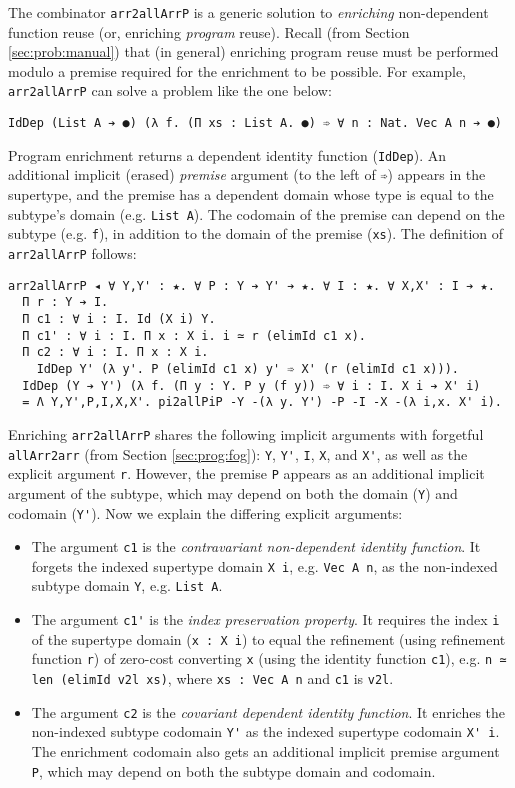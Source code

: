 \documentclass[acmsmall]{acmart}\settopmatter{}
\newcommand{\refsec}[1]{Section \ref{sec:#1}}
\begin{document}
The combinator \verb;arr2allArrP; is a generic solution to
\textit{enriching} non-dependent function reuse
(or, enriching \textit{program} reuse).
Recall (from \refsec{prob:manual}) that (in general)
enriching program reuse must be
performed modulo a premise required for the enrichment
to be possible.
For example, \verb;arr2allArrP; can solve a problem like the one
below:
\begin{verbatim}
IdDep (List A ➔ ●) (λ f. (Π xs : List A. ●) ➾ ∀ n : Nat. Vec A n ➔ ●)
\end{verbatim}
Program enrichment returns a dependent identity function
(\verb;IdDep;). 
An additional implicit (erased) \textit{premise} argument
(to the left of \verb;➾;)
appears in the supertype, and the premise has a dependent domain
whose type is equal to the subtype's domain (e.g. \verb;List A;).
The codomain of the premise can depend on the subtype (e.g. \verb;f;),
in addition to the domain of the premise (\verb;xs;).
The definition of \verb;arr2allArrP; follows:
\begin{verbatim}
arr2allArrP ◂ ∀ Y,Y' : ★. ∀ P : Y ➔ Y' ➔ ★. ∀ I : ★. ∀ X,X' : I ➔ ★.
  Π r : Y ➔ I.
  Π c1 : ∀ i : I. Id (X i) Y.
  Π c1' : ∀ i : I. Π x : X i. i ≃ r (elimId c1 x).
  Π c2 : ∀ i : I. Π x : X i. 
    IdDep Y' (λ y'. P (elimId c1 x) y' ➾ X' (r (elimId c1 x))).
  IdDep (Y ➔ Y') (λ f. (Π y : Y. P y (f y)) ➾ ∀ i : I. X i ➔ X' i)
  = Λ Y,Y',P,I,X,X'. pi2allPiP -Y -(λ y. Y') -P -I -X -(λ i,x. X' i).
\end{verbatim}
Enriching \verb;arr2allArrP; shares the following implicit arguments
with forgetful \verb;allArr2arr; (from \refsec{prog:fog}): \verb;Y;,
\verb;Y';, \verb;I;, \verb;X;, and \verb;X';, as well as the explicit
argument \verb;r;.  However, the premise \verb;P; appears as an
additional implicit argument of the subtype, which may depend on both
the domain (\verb;Y;) and codomain (\verb;Y';). Now we explain the
differing explicit arguments:
\begin{itemize}
\item The argument \verb;c1; is the
  \textit{contravariant non-dependent identity function}.
  It forgets the indexed supertype domain \verb;X i;,
  e.g. \verb;Vec A n;,
  as the non-indexed subtype domain \verb;Y;,
  e.g. \verb;List A;. 

\item The argument \verb;c1'; is the
  \textit{index preservation property}.
  It requires the index \verb;i; of the supertype domain
  (\verb;x : X i;) to equal the refinement (using refinement
  function \verb;r;) of zero-cost converting \verb;x;
  (using the identity function \verb;c1;),
  e.g. \verb;n ≃ len (elimId v2l xs);, where
  \verb;xs : Vec A n; and \verb;c1; is \verb;v2l;.

\item The argument \verb;c2; is the
  \textit{covariant dependent identity function}.
  It enriches the non-indexed subtype codomain \verb;Y';
  as the indexed supertype codomain \verb;X' i;.
  The enrichment codomain also gets an additional implicit premise
  argument \verb;P;, which may depend on both the subtype domain and
  codomain.
\end{itemize}
\end{document}
